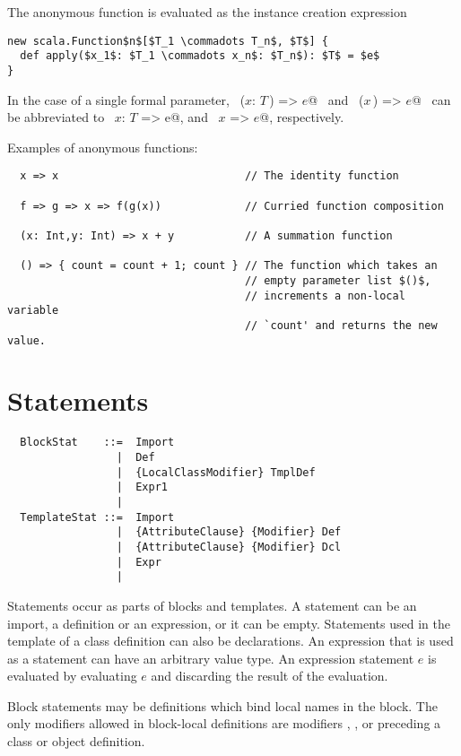The anonymous function is evaluated as the instance creation expression
\begin{lstlisting}
new scala.Function$n$[$T_1 \commadots T_n$, $T$] {
  def apply($x_1$: $T_1 \commadots x_n$: $T_n$): $T$ = $e$
}
\end{lstlisting}
In the case of a single formal parameter, ~\lstinline@($x$: $T\,$) => $e$@~ and ~\lstinline@($x\,$) => $e$@~ 
can be abbreviated to ~\lstinline@$x$: $T$ => e@, and ~\lstinline@$x$ => $e$@, respectively.

\example Examples of anonymous functions:

\begin{lstlisting}
  x => x                             // The identity function

  f => g => x => f(g(x))             // Curried function composition

  (x: Int,y: Int) => x + y           // A summation function

  () => { count = count + 1; count } // The function which takes an
                                     // empty parameter list $()$, 
                                     // increments a non-local variable 
                                     // `count' and returns the new value.
\end{lstlisting}

\section{Statements}
\label{sec:statements}

\syntax\begin{lstlisting}
  BlockStat    ::=  Import
                 |  Def
                 |  {LocalClassModifier} TmplDef
                 |  Expr1
                 | 
  TemplateStat ::=  Import
                 |  {AttributeClause} {Modifier} Def
                 |  {AttributeClause} {Modifier} Dcl
                 |  Expr
                 | 
\end{lstlisting}

Statements occur as parts of blocks and templates.  A statement can be
an import, a definition or an expression, or it can be empty.
Statements used in the template of a class definition can also be
declarations.  An expression that is used as a statement can have an
arbitrary value type. An expression statement $e$ is evaluated by
evaluating $e$ and discarding the result of the evaluation. 

Block statements may be definitions which bind local names in the
block. The only modifiers allowed in block-local definitions are modifiers
, , or  preceding a class or
object definition.

